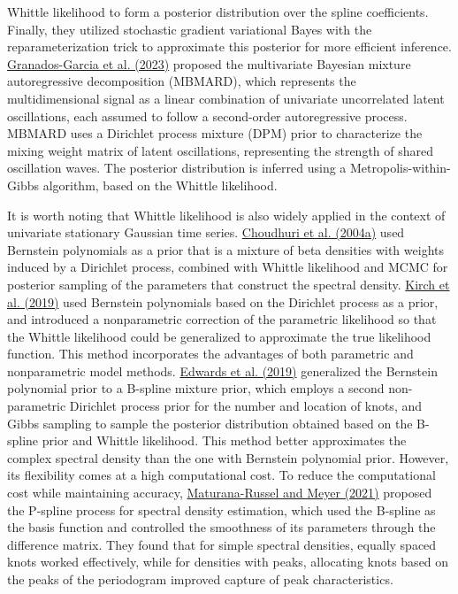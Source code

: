\documentclass[12pt,a4paper]{article}
\begin{document}
Whittle likelihood to form a posterior distribution over the spline coefficients. Finally, they utilized stochastic gradient variational Bayes with the reparameterization trick to approximate this posterior for more efficient inference. \hyperref[gg2023]{Granados-Garcia et al. (2023)} proposed the multivariate Bayesian mixture autoregressive decomposition (MBMARD), which represents the multidimensional signal as a linear combination of univariate uncorrelated latent oscillations, each assumed to follow a second-order autoregressive process. MBMARD uses a Dirichlet process mixture (DPM) prior to characterize the mixing weight matrix of latent oscillations, representing the strength of shared oscillation waves. The posterior distribution is inferred using a Metropolis-within-Gibbs algorithm, based on the Whittle likelihood.

It is worth noting that Whittle likelihood is also widely applied in the context of univariate stationary Gaussian time series. \hyperref[2004a]{Choudhuri et al. (2004a)} used Bernstein polynomials as a prior that is a mixture of beta densities with weights induced by a Dirichlet process, combined with Whittle likelihood and MCMC for posterior sampling of the parameters that construct the spectral density. \hyperref[kirch2019]{Kirch et al. (2019)} used Bernstein polynomials based on the Dirichlet process as a prior, and introduced a nonparametric correction of the parametric likelihood so that the Whittle likelihood could be generalized to approximate the true likelihood function. This method incorporates the advantages of both parametric and nonparametric model methods. \hyperref[edwards2019]{Edwards et al. (2019)} generalized the Bernstein polynomial prior to a B-spline mixture prior, which employs a second non-parametric Dirichlet process prior for the number and location of knots, and Gibbs sampling to sample the posterior distribution obtained based on the B-spline prior and Whittle likelihood. This method better approximates the complex spectral density than the one with Bernstein polynomial prior. However, its flexibility comes at a high computational cost. To reduce the computational cost while maintaining accuracy,  \hyperref[russel2021]{Maturana-Russel and Meyer (2021)} proposed the P-spline process for spectral density estimation, which used the B-spline as the basis function and controlled the smoothness of its parameters through the difference matrix. They found that for simple spectral densities, equally spaced knots worked effectively, while for densities with peaks, allocating knots based on the peaks of the periodogram improved capture of peak characteristics.
\end{document}
